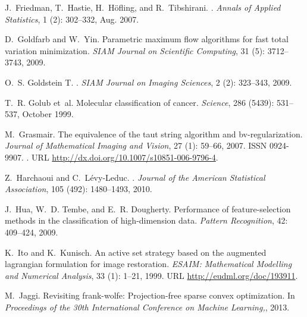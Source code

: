 \documentclass[twoside,11pt]{article}
\numberwithin{equation}{section}
\numberwithin{theorem}{section}
\begin{document}
\begin{thebibliography}{86}
J.~{Friedman}, T.~{Hastie}, H.~{H{\"o}fling}, and R.~{Tibshirani}.
.
\newblock \emph{Annals of Applied Statistics}, 1 (2):
  302--332, Aug. 2007.

D.~Goldfarb and W.~Yin.
\newblock Parametric maximum flow algorithms for fast total variation
  minimization.
\newblock \emph{SIAM Journal on Scientific Computing}, 31
  (5): 3712--3743, 2009.

O.~S. {Goldstein T.}
.
\newblock \emph{SIAM Journal on Imaging Sciences}, 2 (2):
  323--343, 2009.

T.~R. Golub et~al.
\newblock Molecular classification of cancer.
\newblock \emph{Science}, 286 (5439): 531--537, October 1999.

M.~Grasmair.
\newblock The equivalence of the taut string algorithm and bv-regularization.
\newblock \emph{Journal of Mathematical Imaging and Vision}, 27
  (1): 59--66, 2007.
\newblock ISSN 0924-9907.
\newblock {}.
\newblock URL \url{http://dx.doi.org/10.1007/s10851-006-9796-4}.

Z.~Harchaoui and C.~L{\'e}vy-Leduc.
.
\newblock \emph{Journal of the American Statistical Association}, 105
  (492): 1480--1493, 2010.

J.~Hua, W.~D. Tembe, and E.~R. Dougherty.
\newblock Performance of feature-selection methods in the classification of
  high-dimension data.
\newblock \emph{Pattern Recognition}, 42: 409--424, 2009.

K.~Ito and K.~Kunisch.
\newblock An active set strategy based on the augmented lagrangian formulation
  for image restoration.
\newblock \emph{ESAIM: Mathematical Modelling and Numerical Analysis},
  33 (1): 1--21, 1999.
\newblock URL \url{http://eudml.org/doc/193911}.

M.~Jaggi.
\newblock Revisiting frank-wolfe: Projection-free sparse convex optimization.
\newblock In \emph{Proceedings of the 30th International Conference on Machine
  Learning,}, 2013.


\end{thebibliography}
\end{document}
